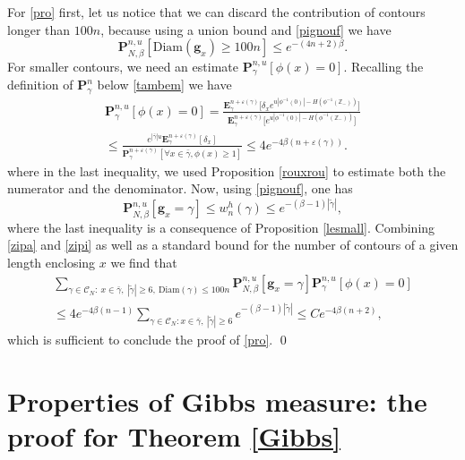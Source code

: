\documentclass[10pt]{amsart}
\let\mathcal\mathscr
\numberwithin{equation}{section}
\theoremstyle{plain}
\theoremstyle{definition}
\newcommand{\bg}{\mathbf{g}}
\newcommand{\Diam}{\mathrm{Diam}}
\newcommand{\cC}{{\ensuremath{\mathcal C}} }
\newcommand{\bP}{{\ensuremath{\mathbf P}} }
\newcommand{\bE}{{\ensuremath{\mathbf E}} }
\newcommand{\bbZ}{{\ensuremath{\mathbb Z}} }
\newcommand{\gb}{\beta}
\newcommand{\gep}{\varepsilon}
\begin{document}
For \eqref{pro}
first, let us notice that we can discard the contribution of contours longer than $100 n$, because using a union bound and \eqref{pignouf} we have
\begin{equation*}
\bP^{n,u}_{N,\gb}\left[ \Diam(\bg_x)\ge 100 n \right]\le e^{-(4n+2)\gb}.
\end{equation*}
For smaller contours,
we need an estimate $\bP^{n,u}_{\gamma}\left[ \phi(x)=0\right]$.
Recalling the definition of $\bP^{n}_{\gamma}$ below \eqref{tambem} we have\vspace*{-3pt}\enlargethispage{.5\baselineskip}%
\begin{multline}\label{zipa}
\bP^{n,u}_{\gamma}\left[ \phi(x)=0\right]=
\frac{\bE^{n+\gep(\gamma)}_{\gamma}\bigl[\delta_x e^{u|\phi^{-1}(0)|-H(\phi^{-1}(\bbZ_-))} \bigr]}{\bE^{n+\gep(\gamma)}_{\gamma}\bigl[e^{u|\phi^{-1}(0)|-H(\phi^{-1}(\bbZ_-))} \bigr]}
\\
\le \frac{e^{|\bar \gamma| u}\bE^{n+\gep(\gamma)}_{\gamma}\left[\delta_x \right]}{\bP^{n+\gep(\gamma)}_{\gamma}[\forall x\in \bar \gamma, \phi(x)\ge 1]}
\le 4e^{- 4\gb(n+\gep(\gamma))}.
\end{multline}
where in the last inequality, we used Proposition \ref{rouxrou} to estimate both the numerator and the denominator.
Now, using \eqref{pignouf}, one has\vspace*{-3pt}
\begin{equation}\label{zipi}
\bP^{n,u}_{N,\gb}\left[ \bg_x=\gamma \right]\le w^h_n(\gamma) \le e^{-(\gb-1)|\tilde \gamma|},
\end{equation}
where the last inequality is a consequence of Proposition \ref{lesmall}.
Combining \eqref{zipa} and \eqref{zipi} as well as a standard bound for the number of contours of a given length enclosing $x$ we find that\vspace*{-3pt}
\begin{multline*}
\sum_{\gamma\in \cC_N: \ x\in \bar \gamma,\ |\tilde \gamma|\ge 6,\ \Diam(\gamma)\le 100 n}
\bP^{n,u}_{N,\gb}\left[ \bg_x=\gamma \right]\bP^{n,u}_{\gamma}\left[ \phi(x)=0\right]\\\le 4e^{- 4\gb(n-1)}
\sum_{\gamma\in \cC_N: x\in \bar \gamma,\ |\tilde \gamma|\ge 6}e^{-(\gb-1)|\tilde \gamma|}\le C e^{- 4\gb(n+2)},
\end{multline*}
which is sufficient to conclude the proof of \eqref{pro}.
\qed

\section{Properties of Gibbs measure: the proof for Theorem \ref{Gibbs}}\label{daverylast}
\end{document}
